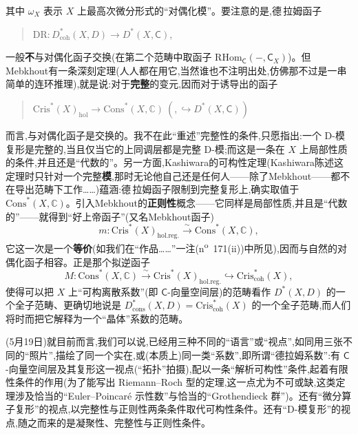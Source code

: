 其中 $\omega_{X}$ 表示 $X$ 上最高次微分形式的“对偶化模”。要注意的是,德\,拉姆函子
\begin{quote}
$\mathrm{DR} : D^{*}_{\mathrm{coh}}(X,D)\longrightarrow D^{*}(X,\mathsf{C})$,
\end{quote}
一般\textbf{不}与对偶化函子交换(在第二个范畴中取函子 $\mathrm{RHom}_{\mathsf{C}}(-,\mathsf{C}_{X})$)。但Mebkhout有一条深刻定理(人人都在用它,当然谁也不注明出处,仿佛那不过是一串简单的连环推理),就是说:对于\textbf{完整}的变元,因而对于诱导出的函子
\begin{quote}
$\mathrm{Cris}^{*}(X)_{\mathrm{hol}}\longrightarrow \mathrm{Cons}^{*}(X,\mathbb{C})\ (,\hookrightarrow D^{*}(X,\mathsf{C}))$
\end{quote}
而言,与对偶化函子是交换的。我不在此“重述”完整性的条件\dmark{},只愿指出:一个 D-模复形是完整的,当且仅当它的上同调层都是完整 D-模;而这是一条在 $X$ 上局部性质的条件,并且还是“代数的”。另一方面,Kashiwara的可构性定理(Kashiwara陈述这定理时只针对一个完整\textbf{模},那时无论他自己还是任何人——除了Mebkhout——都不在导出范畴下工作……)蕴涵:德\,拉姆函子限制到完整复形上,确实取值于 $\mathrm{Cons}^{*}(X,\mathbb{C})$。引入Mebkhout的\textbf{正则性}概念——它同样是局部性质,并且是“代数的”——就得到“好上帝函子”(又名Mebkhout函子)
\begin{equation*}
m : \mathrm{Cris}^{*}(X)_{\mathrm{hol.reg.}}\overset{\sim}{\longrightarrow} \mathrm{Cons}^{*}(X,\mathbb{C}),
\tag{12}
\end{equation*}
它这一次是一个\textbf{等价}(如我们在“作品……”一注(n\textsuperscript{o}~171(ii))中所见),因而与自然的对偶化函子相容。正是那个拟逆函子
\begin{equation*}
M : \mathrm{Cons}^{*}(X,\mathbb{C})\overset{\sim}{\longrightarrow} \mathrm{Cris}^{*}(X)_{\mathrm{hol.reg.}}\hookrightarrow \mathrm{Cris}^{*}_{\mathrm{coh}}(X),
\tag{13}
\end{equation*}
使得可以把 $X$ 上“可构离散系数”(即 $\mathsf{C}$-向量空间层)的范畴看作 $D^{*}(X,D)$ 的一个全子范畴、更确切地说是 $D^{*}_{\mathrm{cons}}(X,D)=\mathrm{Cris}^{*}_{\mathrm{coh}}(X)$ 的一个全子范畴,而人们将时而把它解释为一个“晶体”系数的范畴。

\noindent (5月19日)就目前而言,我们可以说,已经用三种不同的“语言”或“视点”,如同用三张不同的“照片”,描绘了同一个实在,或(本质上)同一类“系数”,即所谓“德拉姆系数”:有 $\mathsf{C}$-向量空间层及其复形这一视点(“拓扑”拍摄),配以一条“解析可构性”条件,起着有限性条件的作用(为了能写出 Riemann--Roch 型的定理,这一点尤为不可或缺,这类定理涉及恰当的“Euler--Poincaré 示性数”与恰当的“\dmark{}Grothendieck 群”)。还有“微分算子复形”的视点,以完整性与正则性两条条件取代可构性条件。还有“D-模复形”的视点,随之而来的是凝聚性、完整性与正则性条件。

